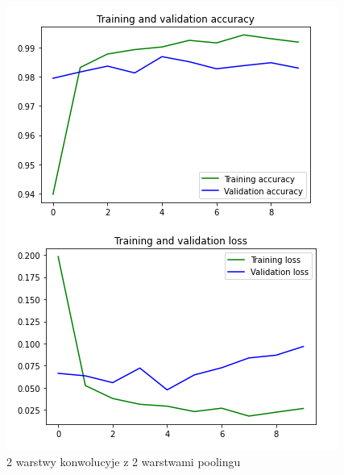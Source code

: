 \documentclass{article}
\begin{document}
\begin{figure}[!htb]
  \centering
  \includegraphics[width=\linewidth]{2_conv.png}
  \caption{2 warstwy konwolucyje z 2 warstwami poolingu}
\end{figure}
\end{document}
